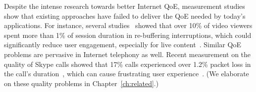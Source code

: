Despite the intense research towards better Internet QoE, 
 measurement studies  show that existing approaches have failed 
to deliver the QoE needed by today's applications. 
For instance, several studies~\cite{sigcomm12,jiang2013shedding,akamai-imc12} 
showed that over 10\% of video viewers spent more than 1\% of session 
duration in re-buffering interruptions, which could significantly reduce user engagement, 
especially for live content~\cite{sigcomm11}. 
Similar QoE problems are pervasive in Internet telephony as well.
Recent measurement on the quality of Skype calls showed that 17\% calls experienced over 
1.2\% packet loss in the call's duration~\cite{via}, which 
can cause frustrating user experience~\cite{itu,cisco-voip}.
(We elaborate on these quality problems in Chapter~\ref{ch:related}.)



